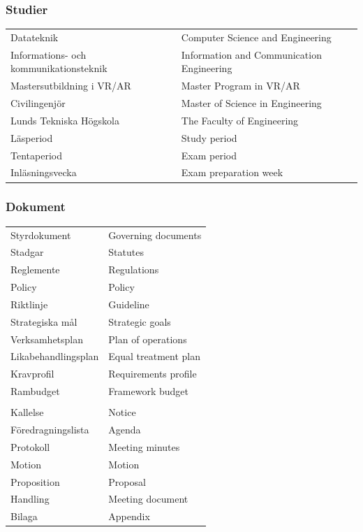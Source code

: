 \documentclass{dsekprotokoll}
\begin{document}
\subsubsection*{Studier}
\begin{center}
    \begin{tabular}{R{6.5cm}|L{6.5cm}}
        Datateknik & Computer Science and Engineering\\
        Informations- och kommunikationsteknik & Information and Communication Engineering\\
        Mastersutbildning i VR/AR & Master Program in VR/AR\\
        Civilingenjör & Master of Science in Engineering\\
        Lunds Tekniska Högskola & The Faculty of Engineering\\
        Läsperiod & Study period\\
        Tentaperiod & Exam period\\
        Inläsningsvecka & Exam preparation week\\
    \end{tabular}
\end{center}

\subsubsection*{Dokument}
\begin{center}
    \begin{tabular}{R{6.5cm}|L{6.5cm}}
        Styrdokument & Governing documents\\
        Stadgar & Statutes \\
        Reglemente & Regulations \\
        Policy & Policy \\
        Riktlinje & Guideline \\
        Strategiska mål & Strategic goals\\
        Verksamhetsplan & Plan of operations\\
        Likabehandlingsplan & Equal treatment plan\\
        Kravprofil & Requirements profile\\
        Rambudget & Framework budget\\
        \\

        Kallelse & Notice \\
        Föredragningslista & Agenda\\
        Protokoll & Meeting minutes\\
        Motion & Motion\\
        Proposition & Proposal\\
        Handling & Meeting document\\
        Bilaga & Appendix\\
    \end{tabular}
\end{center}
\end{document}
